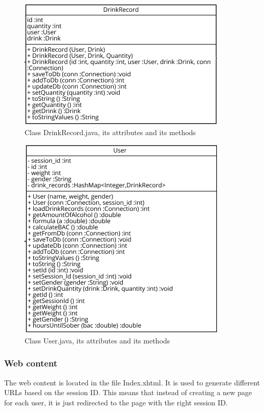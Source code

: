 \begin{figure}[H]
\centering
   \includegraphics{./figures/drinkRecord.png}
   \caption{Class DrinkRecord.java, its attributes and its methods}
   \label{fig:drinkRecordJava}
\end{figure}

\begin{figure}[H]
\centering
   \includegraphics{./figures/user.png}
   \caption{Class User.java, its attributes and its methods}
   \label{fig:userJava}
\end{figure}

\subsubsection{Web content}
\label{sssec:server}

The web content is located in the file Index.xhtml. It is used to generate different URLs based on the session ID. This means that instead of creating a new page for each user, it is just redirected to the page with the right session ID.\\

